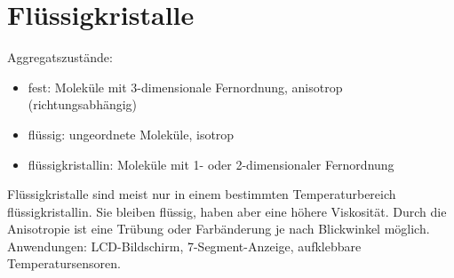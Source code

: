 \section{Flüssigkristalle}
Aggregatszustände:
\begin{itemize}
	\item fest: Moleküle mit 3-dimensionale Fernordnung, anisotrop (richtungsabhängig)
	\item flüssig: ungeordnete Moleküle, isotrop
	\item flüssigkristallin: Moleküle mit 1- oder 2-dimensionaler Fernordnung
\end{itemize}

Flüssigkristalle sind meist nur in einem bestimmten Temperaturbereich flüssigkristallin. Sie bleiben flüssig, haben aber eine höhere Viskosität. Durch die Anisotropie ist eine Trübung oder Farbänderung je nach Blickwinkel möglich. \\

Anwendungen: LCD-Bildschirm, 7-Segment-Anzeige, aufklebbare Temperatursensoren. \\

